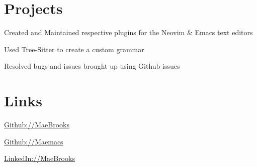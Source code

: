 \documentclass[]{resume-class}
\begin{document}
\begin{minipage}[t]{0.33\textwidth}
\section{Projects}
\sectiontitlespacer
{}
\vspace{\topsep}
\vspace{2}
\begin{tightemize}
  \item{Created and Maintained respective plugins for the Neovim \& Emacs text editors} 
  \item{Used Tree-Sitter to create a custom grammar}
  \item{Resolved bugs and issues brought up using Github issues}
\end{tightemize}

\section{Links}
\sectiontitlespacer
\vspace{4}
\begin{tightemize}
  \item{\href{https://github.com/MaeBrooks}{Github://MaeBrooks}}
  \item{\href{https://github.com/Maemacs}{Github://Maemacs}}
  \item{\href{https://www.linkedin.com/}{LinkedIn://MaeBrooks}}
\end{tightemize}

\end{minipage}
\end{document}
